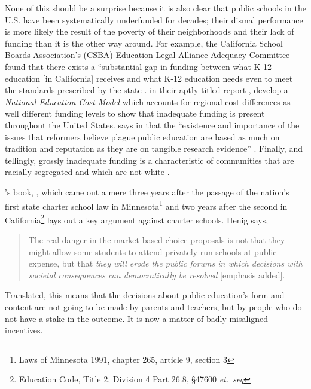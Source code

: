 None of this should be a surprise because it is also clear that public schools in the U.S. have been systematically underfunded for decades; their dismal performance is more likely the result of the poverty of their neighborhoods and their lack of funding than it is the other way around. For example, the California School Boards Association's (CSBA) Education Legal Alliance Adequacy Committee found that there exists a ``substantial gap in funding between what K-12 education [in California] receives and what K-12 education needs even to meet the standards prescribed by the state \parencite[\textit{iii}]{Bray2015}. \textcite{Baker.etal2018} in their aptly titled report , develop a \textit{National Education Cost Model} \parencite%
{Baker.etal2018} which accounts for regional cost differences as well different funding levels to show that inadequate funding is present throughout the United States. \textcite{Garcia2018} says in  that the ``existence and importance of the issues that reformers believe plague public education are based as much on tradition and reputation as they are on tangible research evidence'' \parencite[54]{Garcia2018}. Finally, and tellingly, grossly inadequate funding is a characteristic of communities that are racially segregated and which are not white \parencite{Darling-Hammond2012, Rothstein2017}.

\textcite{Henig1994}'s book, , which came out a mere three years after the passage of the nation's first state charter school law in Minnesota\footnote{Laws of Minnesota 1991, chapter 265, article 9, section 3} and two years after the second in California\footnote{Education Code, Title 2, Division 4 Part 26.8, §47600 \textit{et.\ seq}} lays out a key argument against charter schools. Henig says,
\blockquote[{\parencite[\emph{xiii}]{Henig1994}}]{\SingleSpacing\vspace{-0.5\baselineskip}%
  The real danger in the market-based choice proposals is not that they might allow some students to attend privately run schools at public expense, but that \emph{they will erode the public forums in which decisions with societal consequences can democratically be resolved} [emphasis added].}
Translated, this means that the decisions about public education's form and content are not going to be made by parents and teachers, but by people who do not have a stake in the outcome. It is now a matter of badly misaligned incentives. %

